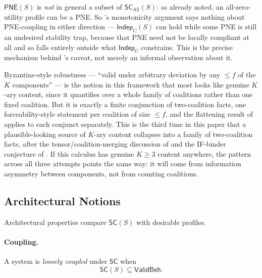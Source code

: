 \begin{remark}
$\mathsf{PNE}(S)$ is \emph{not} in general a subset of
$\mathsf{SC}_{\mathrm{All}}(S)$: as already noted, an all-zero-utility profile
can be a PNE. So 's monotonicity argument says
nothing about PNE-coupling in either direction --- $\mathsf{Indep}_C(S)$ can
hold while some PNE is still an undesired stability trap, because that PNE
need not be locally compliant at all and so falls entirely outside what
$\mathsf{Indep}_C$ constrains. This is the precise mechanism behind
's caveat, not merely an informal observation about
it.
\end{remark}

\begin{remark}
Byzantine-style robustness --- ``valid under arbitrary deviation by any
$\le f$ of the $K$ components'' --- is the notion in this framework that most
looks like genuine $K$-ary content, since it quantifies over a whole family
of coalitions rather than one fixed coalition. But it is exactly a finite
conjunction of two-coalition facts, one forceability-style statement per
coalition of size $\le f$, and the flattening result of
 applies to each conjunct separately.
This is the third time in this paper that a plausible-looking source of
$K$-ary content collapses into a family of two-coalition facts, after the
tensor/coalition-merging discussion of  and the
IF-binder conjecture of . If this
calculus has genuine $K\ge 3$ content anywhere, the pattern across all three
attempts points the same way: it will come from information asymmetry
between components, not from counting coalitions.
\end{remark}

\subsection{Architectural Notions}

Architectural properties compare $\mathsf{SC}(S)$ with desirable profiles.

\paragraph{Coupling.}

A system is \emph{loosely coupled} under $\mathsf{SC}$ when
\[
\mathsf{SC}(S)\subseteq \mathsf{ValidBeh}.
\]

